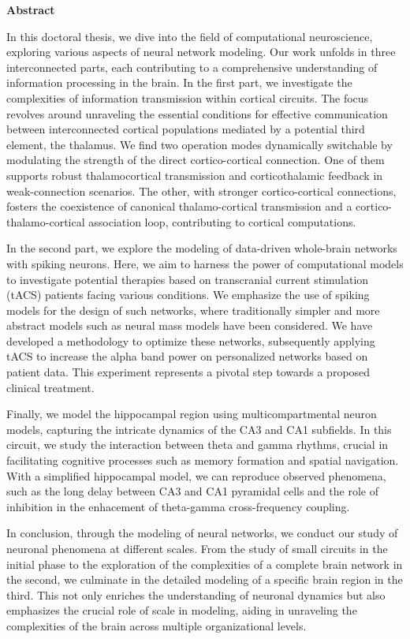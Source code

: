 \documentclass[../main.tex]{subfiles}
\begin{document}
\begin{center}
    \textbf{Abstract}
\end{center}

In this doctoral thesis, we dive into the field of computational neuroscience, exploring various aspects of neural network modeling.
Our work unfolds in three interconnected parts, each contributing to a comprehensive understanding of information processing in the brain.
In the first part, we investigate the complexities of information transmission within cortical circuits.
The focus revolves around unraveling the essential conditions for effective communication between interconnected cortical populations mediated by a potential third element, the thalamus.
We find two operation modes dynamically switchable by modulating the strength of the direct cortico-cortical connection.
One of them supports robust thalamocortical transmission and corticothalamic feedback in weak-connection scenarios.
The other, with stronger cortico-cortical connections, fosters the coexistence of canonical thalamo-cortical transmission and a cortico-thalamo-cortical association loop, contributing to cortical computations.

In the second part, we explore the modeling of data-driven whole-brain networks with spiking neurons.
Here, we aim to harness the power of computational models to investigate potential therapies based on transcranial current stimulation (tACS) patients facing various conditions.
We emphasize the use of spiking models for the design of such networks, where traditionally simpler and more abstract models such as neural mass models have been considered.
We have developed a methodology to optimize these networks, subsequently applying tACS to increase the alpha band power on personalized networks based on patient data.
This experiment represents a pivotal step towards a proposed clinical treatment.

Finally, we model the hippocampal region using multicompartmental neuron models, capturing the intricate dynamics of the CA3 and CA1 subfields.
In this circuit, we study the interaction between theta and gamma rhythms, crucial in facilitating cognitive processes such as memory formation and spatial navigation.
With a simplified hippocampal model, we can reproduce observed phenomena, such as the long delay between CA3 and CA1 pyramidal cells and the role of inhibition in the enhacement of theta-gamma cross-frequency coupling.

In conclusion, through the modeling of neural networks, we conduct our study of neuronal phenomena at different scales.
From the study of small circuits in the initial phase to the exploration of the complexities of a complete brain network in the second, we culminate in the detailed modeling of a specific brain region in the third.
This not only enriches the understanding of neuronal dynamics but also emphasizes the crucial role of scale in modeling, aiding in unraveling the complexities of the brain across multiple organizational levels.
\end{document}
